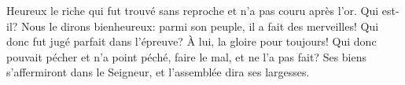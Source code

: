 Heureux le riche qui fut trouvé sans reproche et n’a pas couru après l’or.
Qui est-il? Nous le dirons bienheureux:
	parmi son peuple, il a fait des merveilles!
Qui donc fut jugé parfait dans l’épreuve?
	À lui, la gloire pour toujours!
Qui donc pouvait pécher et n’a point péché, faire le mal, et ne l’a pas fait?
	Ses biens s’affermiront dans le Seigneur, et l’assemblée dira ses largesses.
